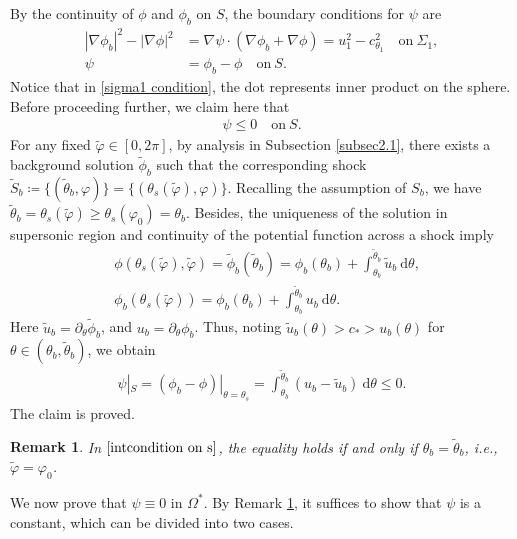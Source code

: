 \documentclass[reqno,12pt]{amsart}
\newcommand{\dd}{\mathrm{d}}
\newtheorem{remark}{Remark}[section]
\numberwithin{equation}{section}
\begin{document}
By the continuity of $\phi$ and $\phi_b$ on $S$, the boundary conditions for $\psi$ are
	\begin{align}
	|\nabla \phi_b|^2-|\nabla \phi|^2&=\nabla\psi\cdot(\nabla\phi_b+\nabla\phi)=u_1^2-c_{\theta_1}^2\quad\text{on}~\Sigma_1,\label{sigma1 condition}\\
    \psi&=\phi_b-\phi\quad\text{on}~S.
	\end{align}
Notice that in \eqref{sigma1 condition}, the dot represents inner product on the sphere. Before proceeding further, we claim here that
	\begin{align}\label{condition on S}
		\psi\leq0\quad\text{on}~S.
	\end{align}
For any fixed $\tilde{\varphi}\in [0,2\pi]$, by analysis in Subsection \ref{subsec2.1}, there exists a background solution $\tilde{\phi}_b$ such that the corresponding shock $\tilde{S}_b\coloneqq\{(\tilde{\theta}_b,\varphi)\}=\{(\theta_s(\tilde{\varphi}),\varphi)\}$. Recalling the assumption of $S_b$, we have $\tilde{\theta}_b=\theta_s(\tilde{\varphi})\geq \theta_{s}(\varphi_0)=\theta_b$. Besides, the uniqueness of the solution in supersonic region and continuity of the potential function across a shock imply 
		\begin{align*}		&\phi(\theta_s(\tilde{\varphi}),\tilde{\varphi})=\tilde{\phi}_b(\tilde{\theta}_b)=\phi_b(\theta_b)+\int_{\theta_b}^{\tilde{\theta}_b}\tilde{u}_b~\dd\theta,\\		&\phi_b(\theta_s(\tilde{\varphi}))=\phi_b(\theta_b)+\int_{\theta_b}^{\tilde{\theta}_b}u_b~\dd\theta.
		\end{align*}
Here $\tilde{u}_b=\partial_\theta \tilde{\phi}_b$, and ${u}_b=\partial_\theta {\phi}_b$.  
Thus, noting $\tilde{u}_b(\theta)>c_*>u_b(\theta)$ for $\theta\in(\theta_b,\tilde{\theta}_b)$, we obtain
		\begin{align}\label{intcondition on s}
			\psi|_{S}=(\phi_b-\phi)|_{\theta=\theta_s}=\int_{\theta_b}^{\tilde{\theta}_b}(u_b-\tilde{u}_b)~\dd \theta \leq0.
			\end{align}
The claim is proved.
		
		\begin{remark}\label{psie0}
				In $\eqref{intcondition on s}$, the equality holds if and only if $\theta_b=\tilde{\theta}_b$, i.e., $\tilde{\varphi}=\varphi_0$.
		\end{remark}
		
We now prove that $\psi \equiv 0$ in $\Omega^*$. By Remark \ref{psie0}, it suffices to show that $\psi$ is a constant, which can be divided into two cases.
\end{document}
